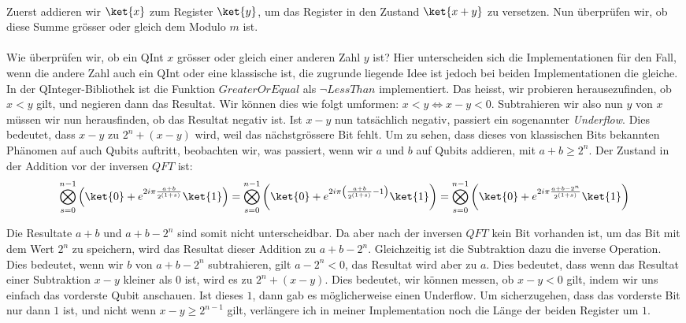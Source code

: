 \paragraph{}

Zuerst addieren wir $\ket{x}$ zum Register $\ket{y}$, um das Register in den Zustand $\ket{x + y}$ zu versetzen. Nun überprüfen wir, ob diese Summe grösser oder gleich dem Modulo $m$ ist. 

\paragraph{}

Wie überprüfen wir, ob ein QInt $x$ grösser oder gleich einer anderen Zahl $y$ ist? Hier unterscheiden sich die Implementationen für den Fall, wenn die andere Zahl auch ein QInt oder eine klassische ist, die zugrunde liegende Idee ist jedoch bei beiden Implementationen die gleiche. In der QInteger-Bibliothek ist die Funktion $GreaterOrEqual$ als $\neg LessThan$ implementiert. Das heisst, wir probieren herausezufinden, ob $x < y$ gilt, und negieren dann das Resultat. Wir können dies wie folgt umformen: $x < y \Leftrightarrow x - y < 0$. Subtrahieren wir also nun $y$ von $x$ müssen wir nun herausfinden, ob das Resultat negativ ist. Ist $x - y$ nun tatsächlich negativ, passiert ein sogenannter \textit{Underflow}. Dies bedeutet, dass $x - y$ zu $2^n + (x - y)$ wird, weil das nächstgrössere Bit fehlt. Um zu sehen, dass dieses von klassischen Bits bekannten Phänomen auf auch Qubits auftritt, beobachten wir, was passiert, wenn wir $a$ und $b$ auf Qubits addieren, mit $a + b \geq 2^n$. Der Zustand in der Addition vor der inversen $QFT$ ist: $$\bigotimes_{s = 0}^{n - 1}{\left( \ket{0} + e^{2i\pi\frac{a + b}{2^{(1 + s)}}}\ket{1} \right)} = \bigotimes_{s = 0}^{n - 1}{\left(\ket{0} + e^{2i\pi\left(\frac{a + b}{2^{(1 + s)}} - 1\right)}\ket{1} \right)} = \bigotimes_{s = 0}^{n - 1}{\left( \ket{0} + e^{2i\pi\frac{a + b - 2^n}{2^{(1 + s)}}}\ket{1} \right)}$$

Die Resultate $a + b$ und $a + b - 2^n$ sind somit nicht unterscheidbar. Da aber nach der inversen $QFT$ kein Bit vorhanden ist, um das Bit mit dem Wert $2^n$ zu speichern, wird das Resultat dieser Addition zu $a + b - 2^n$. Gleichzeitig ist die Subtraktion dazu die inverse Operation. Dies bedeutet, wenn wir $b$ von $a + b - 2^n$ subtrahieren, gilt $a - 2^n < 0$, das Resultat wird aber zu $a$. Dies bedeutet, dass wenn das Resultat einer Subtraktion $x - y$ kleiner als $0$ ist, wird es zu $2^n + (x - y)$. Dies bedeutet, wir können messen, ob $x - y < 0$ gilt, indem wir uns einfach das vorderste Qubit anschauen. Ist dieses $1$, dann gab es möglicherweise einen Underflow. Um sicherzugehen, dass das vorderste Bit nur dann $1$ ist, und nicht wenn $x - y \geq 2^{n - 1}$ gilt, verlängere ich in meiner Implementation noch die Länge der beiden Register um $1$. 

